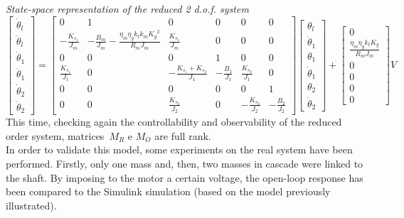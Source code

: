 \textit{State-space representation of the reduced 2 d.o.f. system}
\begin{equation}
	\begin{bmatrix}
		\dot{\theta}_l \\
		\ddot{\theta}_l \\
		\dot{\theta}_1 \\
		\ddot{\theta}_1 \\
		\dot{\theta}_2 \\
		\ddot{\theta}_2
	\end{bmatrix}
	=
	\begin{bmatrix}
		0 &1 & 0 & 0 & 0 & 0 \\
		-\frac{K_{s_1}}{J_m} & -\frac{B_m}{J_m}-\frac{\eta_m \eta_g k_t k_m {K_g}^2}{R_m J_m}  & \frac{K_{s_1}}{J_m} & 0 & 0 & 0 \\
		0 & 0 & 0 & 1 & 0 & 0 \\
		\frac{K_{s_1}}{J_1} & 0 & -\frac{K_{s_1}+K_{s_2}}{J_1} & -\frac{B_1}{J_1} & \frac{K_{s_2}}{J_1} & 0 \\
		0 & 0 & 0 & 0 & 0 & 1 \\
		0 & 0 & \frac{K_{s_2}}{J_2} & 0 & -\frac{K_{s_2}}{J_2} & -\frac{B_2}{J_2}
	\end{bmatrix}
	\begin{bmatrix}
		\theta_l \\
		\dot{\theta}_1 \\
		\theta_1 \\
		\dot{\theta}_1 \\
		\theta_2 \\
		\dot{\theta}_2
	\end{bmatrix}
	+
	\begin{bmatrix}
		0 \\
		\frac{\eta_m \eta_g k_t K_g}{R_m J_m} \\
		0 \\
		0 \\
		0 \\
		0
	\end{bmatrix}
	V
\end{equation}
This time, checking again the controllability and observability of the reduced order system, matrices~$M_R$ e $M_O$ are full rank. \\

In order to validate this model, some experiments on the real system have been performed. Firstly, only one mass and, then, two masses in cascade were linked to the shaft. By imposing to the motor a certain voltage, the open-loop response has been compared to the Simulink simulation (based on the model previously illustrated).

